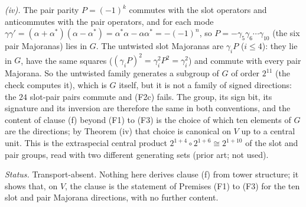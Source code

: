 \emph{(iv).} The pair parity $P = (-1)^{k}$ commutes with the slot operators and anticommutes with the pair operators, and for each mode $\gamma\gamma' = (\alpha + \alpha^{*})(\alpha - \alpha^{*}) = \alpha^{*}\alpha - \alpha\alpha^{*} = -(-1)^{n}$, so $P = -\gamma_{5}\gamma_{6}\cdots\gamma_{10}$ (the six pair Majoranas) lies in $G$. The untwisted slot Majoranas are $\gamma_{i}P$ ($i \le 4$): they lie in $G$, have the same squares ($(\gamma_{i}P)^{2} = \gamma_{i}^{2}P^{2} = \gamma_{i}^{2}$) and commute with every pair Majorana. So the untwisted family generates a subgroup of $G$ of order $2^{11}$ (the check computes it), which is $G$ itself, but it is not a family of signed directions: the $24$ slot-pair pairs commute and (F2c) fails. The group, its sign bit, its signature and its inversion are therefore the same in both conventions, and the content of clause (f) beyond (F1) to (F3) is the choice of which ten elements of $G$ are the directions; by Theorem (iv) that choice is canonical on $V$ up to a central unit. This is the extraspecial central product $2^{1+4}\circ 2^{1+6} \cong 2^{1+10}$ of the slot and pair groups, read with two different generating sets (prior art; not used).

\emph{Status.} Transport-absent. Nothing here derives clause (f) from tower structure; it shows that, on $V$, the clause is the statement of Premises (F1) to (F3) for the ten slot and pair Majorana directions, with no further content.
